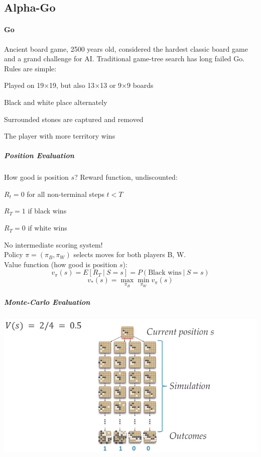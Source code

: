 \documentclass[10pt]{report}
\begin{document}
\subsection{Alpha-Go}
\paragraph{Go} Ancient board game, 2500 years old, considered the hardest classic board game and a grand challenge for AI. Traditional game-tree search has long failed Go.\\
Rules are simple:
\begin{list}{}{}
	\item Played on 19$\times$19, but also 13$\times$13 or 9$\times$9 boards
	\item Black and white place alternately
	\item Surrounded stones are captured and removed
	\item The player with more territory wins
\end{list}
\subparagraph{Position Evaluation} How good is position $s$? Reward function, undiscounted:
\begin{list}{}{}
	\item $R_t = 0$ for all non-terminal steps $t<T$
	\item $R_T = 1$ if black wins
	\item $R_T = 0$ if white wins
\end{list}
No intermediate scoring system!\\
Policy $\pi=(\pi_B,\pi_W)$ selects moves for both players B, W.\\
Value function (how good is position $s$):
$$v_\pi(s) = E[R_T\:|\:S=s] = P(\text{Black wins}\:|\:S=s)$$
$$v_*(s) = \max_{\pi_B}\min_{\pi_W} v_\pi(s)$$
\subparagraph{Monte-Carlo Evaluation}
\begin{center}
	\includegraphics[scale=0.5]{187.png} %
\end{center}
\end{document}
